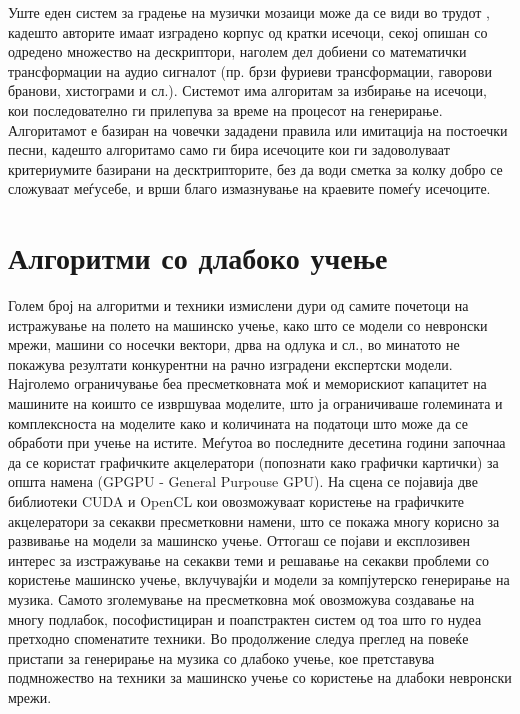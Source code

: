 Уште еден систем за градење на музички мозаици може да се види во трудот \cite{Schwarz2006}, кадешто авторите имаат изградено корпус од кратки исечоци, секој опишан со одредено множество на дескриптори, наголем дел добиени со математички трансформации на аудио сигналот (пр. брзи фуриеви трансформации, гаворови бранови, хистограми и сл.). Системот има алгоритам за избирање на исечоци, кои последователно ги прилепува за време на процесот на генерирање. Алгоритамот е базиран на човечки зададени правила или имитација на постоечки песни, кадешто алгоритамо само ги бира исечоците кои ги задоволуваат критериумите базирани на десктрипторите, без да води сметка за колку добро се сложуваат меѓусебе, и врши благо измазнување на краевите помеѓу исечоците.

\section{Алгоритми со длабоко учење} 

Голем број на алгоритми и техники измислени дури од самите почетоци на истражување на полето на машинско учење, како што се модели со невронски мрежи, машини со носечки вектори, дрва на одлука и сл., во минатото не покажува резултати конкурентни на рачно изградени експертски модели. Најголемо ограничување беа пресметковната моќ и меморискиот капацитет на машините на коишто се извршуваа моделите, што ја ограничиваше големината и комплексноста на моделите како и количината на податоци што може да се обработи при учење на истите. Меѓутоа во последните десетина години започнаа да се користат графичките акцелератори (попознати како графички картички) за општа намена (GPGPU - General Purpouse GPU). На сцена се појавија две библиотеки CUDA и OpenCL кои овозможуваат користење на графичките акцелератори за секакви пресметковни намени, што се покажа многу корисно за развивање на модели за машинско учење. Оттогаш се појави и експлозивен интерес за изстражување на секакви теми и решавање на секакви проблеми со користење машинско учење, вклучувајќи и модели за компјутерско генерирање на музика. Самото зголемување на пресметковна моќ овозможува создавање на многу подлабок, пософистициран и поапстрактен систем од тоа што го нудеа претходно споменатите техники. Во продолжение следуа преглед на повеќе пристапи за генерирање на музика со длабоко учење, кое претставува подмножество на техники за машинско учење со користење на длабоки невронски мрежи.

